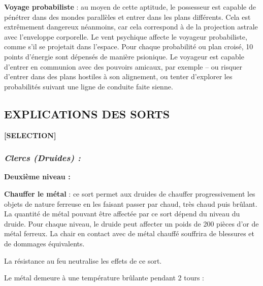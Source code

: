 \documentclass[11pt]{article}
\begin{document}
{\bigskip

\textbf{Voyage probabiliste} : au moyen de cette aptitude, le possesseur est capable de pénétrer dans des mondes parallèles et entrer dans les plans différents. Cela est extrêmement dangereux néanmoins, car cela correspond à de la projection astrale avec l'enveloppe corporelle. Le vent psychique affecte le voyageur probabiliste, comme s'il se projetait dans l'espace. Pour chaque probabilité ou plan croisé, 10 points d'énergie sont dépensés de manière psionique. Le voyageur est capable d'entrer en communion avec des pouvoirs amicaux, par exemple -- ou risquer d'entrer dans des plans hostiles à son alignement, ou tenter d'explorer les probabilités suivant une ligne de conduite faite sienne.

\newpage
\subsection*{\normalsize EXPLICATIONS DES SORTS}

\begin{center}
\textbf{[SELECTION]}
\end{center}

\subsubsection*{\textit{Clercs (Druides) :}}

\textbf{Deuxième niveau :}

\bigskip

\label{sort-chauffe-metal}\textbf{Chauffer le métal} : ce sort permet aux druides de chauffer progressivement les objets de nature ferreuse en les faisant passer par chaud, très chaud puis brûlant. La quantité de métal pouvant être affectée par ce sort dépend du niveau du druide. Pour chaque niveau, le druide peut affecter un poids de 200 pièces d'or de métal ferreux. La chair en contact avec de métal chauffé souffrira de blessures et de dommages équivalents.

\bigskip

La résistance au feu neutralise les effets de ce sort.

\bigskip

Le métal demeure à une température brûlante pendant 2 tours :

}
\end{document}
